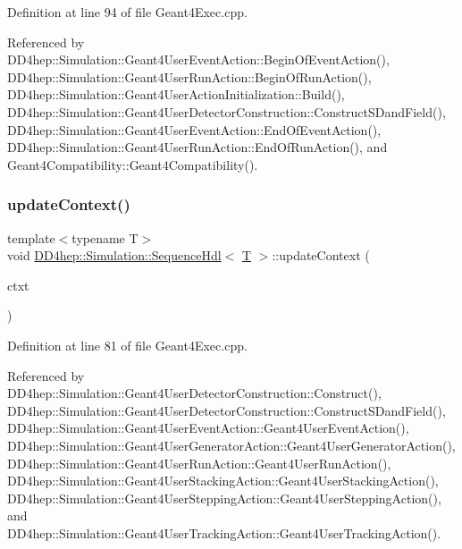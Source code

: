 Definition at line 94 of file Geant4\+Exec.\+cpp.



Referenced by D\+D4hep\+::\+Simulation\+::\+Geant4\+User\+Event\+Action\+::\+Begin\+Of\+Event\+Action(), D\+D4hep\+::\+Simulation\+::\+Geant4\+User\+Run\+Action\+::\+Begin\+Of\+Run\+Action(), D\+D4hep\+::\+Simulation\+::\+Geant4\+User\+Action\+Initialization\+::\+Build(), D\+D4hep\+::\+Simulation\+::\+Geant4\+User\+Detector\+Construction\+::\+Construct\+S\+Dand\+Field(), D\+D4hep\+::\+Simulation\+::\+Geant4\+User\+Event\+Action\+::\+End\+Of\+Event\+Action(), D\+D4hep\+::\+Simulation\+::\+Geant4\+User\+Run\+Action\+::\+End\+Of\+Run\+Action(), and Geant4\+Compatibility\+::\+Geant4\+Compatibility().

\hypertarget{class_d_d4hep_1_1_simulation_1_1_sequence_hdl_a6f0b9120d430d93caafb6d3d9f360ecf}{}\label{class_d_d4hep_1_1_simulation_1_1_sequence_hdl_a6f0b9120d430d93caafb6d3d9f360ecf} 
\subsubsection{\texorpdfstring{update\+Context()}{updateContext()}}
{\footnotesize\ttfamily template$<$typename T$>$ \\
void \hyperlink{class_d_d4hep_1_1_simulation_1_1_sequence_hdl}{D\+D4hep\+::\+Simulation\+::\+Sequence\+Hdl}$<$ \hyperlink{class_t}{T} $>$\+::update\+Context (\begin{DoxyParamCaption}\item[{\hyperlink{class_d_d4hep_1_1_simulation_1_1_geant4_context}{Geant4\+Context} $\ast$}]{ctxt }\end{DoxyParamCaption})\hspace{0.3cm}{\ttfamily [inline]}}



Definition at line 81 of file Geant4\+Exec.\+cpp.



Referenced by D\+D4hep\+::\+Simulation\+::\+Geant4\+User\+Detector\+Construction\+::\+Construct(), D\+D4hep\+::\+Simulation\+::\+Geant4\+User\+Detector\+Construction\+::\+Construct\+S\+Dand\+Field(), D\+D4hep\+::\+Simulation\+::\+Geant4\+User\+Event\+Action\+::\+Geant4\+User\+Event\+Action(), D\+D4hep\+::\+Simulation\+::\+Geant4\+User\+Generator\+Action\+::\+Geant4\+User\+Generator\+Action(), D\+D4hep\+::\+Simulation\+::\+Geant4\+User\+Run\+Action\+::\+Geant4\+User\+Run\+Action(), D\+D4hep\+::\+Simulation\+::\+Geant4\+User\+Stacking\+Action\+::\+Geant4\+User\+Stacking\+Action(), D\+D4hep\+::\+Simulation\+::\+Geant4\+User\+Stepping\+Action\+::\+Geant4\+User\+Stepping\+Action(), and D\+D4hep\+::\+Simulation\+::\+Geant4\+User\+Tracking\+Action\+::\+Geant4\+User\+Tracking\+Action().



